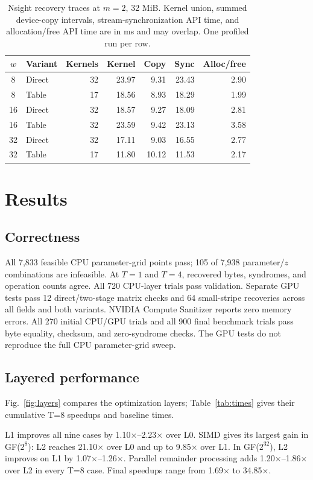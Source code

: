 \documentclass[conference]{IEEEtran}
\begin{document}
\begin{table}[t]
\caption{Nsight recovery traces at $m=2$, 32 MiB. Kernel union, summed device-copy intervals, stream-synchronization API time, and allocation/free API time are in ms and may overlap. One profiled run per row.}
\label{tab:gpu-profile}
\centering
\footnotesize
\setlength{\tabcolsep}{3pt}
\begin{tabular}{clrrrrr}
\hline
$w$ & Variant & Kernels & Kernel & Copy & Sync & Alloc/free\\
\hline
8&Direct&32&23.97&9.31&23.43&2.90\\
8&Table&17&18.56&8.93&18.29&1.99\\
16&Direct&32&18.57&9.27&18.09&2.81\\
16&Table&32&23.59&9.42&23.13&3.58\\
32&Direct&32&17.11&9.03&16.55&2.77\\
32&Table&17&11.80&10.12&11.53&2.17\\
\hline
\end{tabular}
\end{table}

\section{Results}
\subsection{Correctness}
All 7,833 feasible CPU parameter-grid points pass; 105 of 7,938 parameter/$z$ combinations are infeasible. At $T=1$ and $T=4$, recovered bytes, syndromes, and operation counts agree. All 720 CPU-layer trials pass validation. Separate GPU tests pass 12 direct/two-stage matrix checks and 64 small-stripe recoveries across all fields and both variants. NVIDIA Compute Sanitizer reports zero memory errors. All 270 initial CPU/GPU trials and all 900 final benchmark trials pass byte equality, checksum, and zero-syndrome checks. The GPU tests do not reproduce the full CPU parameter-grid sweep.

\subsection{Layered performance}
Fig.~\ref{fig:layers} compares the optimization layers; Table~\ref{tab:times} gives their cumulative T=8 speedups and baseline times.

L1 improves all nine cases by 1.10$\times$--2.23$\times$ over L0. SIMD gives its largest gain in GF($2^8$): L2 reaches 21.10$\times$ over L0 and up to 9.85$\times$ over L1. In GF($2^{32}$), L2 improves on L1 by 1.07$\times$--1.26$\times$. Parallel remainder processing adds 1.20$\times$--1.86$\times$ over L2 in every T=8 case. Final speedups range from 1.69$\times$ to 34.85$\times$.
\end{document}
